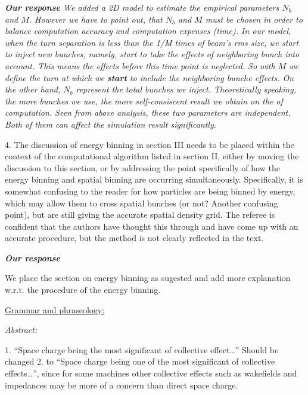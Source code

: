 \documentclass{article}
\begin{document}
{{ \vspace{+2mm}
 {\it {\bf Our response} 
 We added a 2D model to estimate the empirical parameters $N_b$ and $M$.
 However we have to point out, that  $N_b$ and $M$ must be chosen
   in order to balance computation accuracy and computation expenses (time).
   In our model, when the turn separation is less than the 1/M times of beam's rms size, 
   we start to inject new bunches, namely, start to take the effects of neighboring bunch into account. 
   This means the effects before this time point is neglected. 
   So with $M$ we define the turn at which we {\bf start} to include the neighboring bunche effects. 
   On the other hand, $N_b$ represent the total bunches we inject.
   Theoretically speaking, the more bunches we use, the more self-consiscent result we obtain on the of computation. 
   Seen from above analysis, these two parameters are independent. Both of them can affect the simulation result significantly.
 } 
 \vspace{+2mm}

 
 4. The discussion of energy binning in section III needs to be placed within 
 the context of the computational algorithm listed in section II, either by 
 moving the discussion to this section, or by addressing the point 
 specifically of how the energy binning and spatial binning are occurring 
 simultaneously. Specifically, it is somewhat confusing to the reader for how 
 particles are being binned by energy, which may allow them to cross spatial 
 bunches (or not? Another confusing point), but are still giving the accurate 
 spatial density grid. The referee is confident that the authors have thought 
 this through and have come up with an accurate procedure, but the method is 
 not clearly reflected in the text. 
 
 \vspace{+2mm}
 {\it {\bf Our response} 
 
 We place the section on energy binning as sugested and add more explanation w.r.t. the 
 procedure of the energy binning.
 }
 
 
 
 
 
 
 \underline {Grammar and phraseology: }
 
 \textit{Abstract: }
 
 1. ``Space charge being the most significant of collective effect{\ldots}'' 
 Should be changed 2. to ``Space charge being one of the most significant of 
 collective effects{\ldots}'', since for some machines other collective 
 effects such as wakefields and impedances may be more of a concern than 
 direct space charge. 
 

}}
\end{document}
